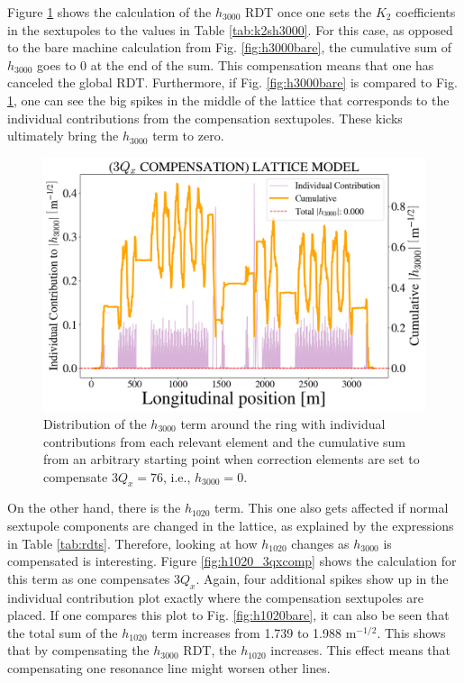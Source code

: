 Figure \ref{fig:h3000_3qxcomp} shows the calculation of the $h_{3000}$ RDT once one sets the $K_2$ coefficients in the sextupoles to the values in Table \ref{tab:k2sh3000}. For this case, as opposed to the bare machine calculation from Fig. \ref{fig:h3000bare}, the cumulative sum of $h_{3000}$ goes to 0 at the end of the sum. This compensation means that one has canceled the global RDT. Furthermore, if Fig. \ref{fig:h3000bare} is compared to Fig. \ref{fig:h3000_3qxcomp}, one can see the big spikes in the middle of the lattice that corresponds to the individual contributions from the compensation sextupoles. These kicks ultimately bring the $h_{3000}$ term to zero. 

\begin{figure}[H]
    \centering
    \includegraphics[width=\columnwidth]{chapter4/h3000_3qxcomp.png}
    \caption{Distribution of the $h_{3000}$ term around the ring with individual contributions from each relevant element and the cumulative sum from an arbitrary starting point when correction elements are set to compensate $3Q_x=76$, i.e., $h_{3000}=0$.}
    \label{fig:h3000_3qxcomp}
\end{figure}

On the other hand, there is the $h_{1020}$ term. This one also gets affected if normal sextupole components are changed in the lattice, as explained by the expressions in Table \ref{tab:rdts}. Therefore, looking at how $h_{1020}$ changes as $h_{3000}$ is compensated is interesting. Figure \ref{fig:h1020_3qxcomp} shows the calculation for this term as one compensates $3Q_x$. Again, four additional spikes show up in the individual contribution plot exactly where the compensation sextupoles are placed. If one compares this plot to Fig. \ref{fig:h1020bare}, it can also be seen that the total sum of the $h_{1020}$ term increases from 1.739 to 1.988 m$^{-1/2}$. This shows that by compensating the $h_{3000}$ RDT, the $h_{1020}$ increases. This effect means that compensating one resonance line might worsen other lines. 

